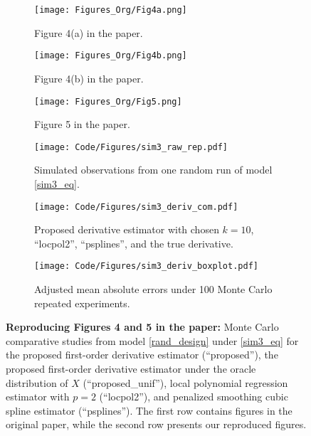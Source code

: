 \documentclass{uwstat572}
\theoremstyle{definition}
\theoremstyle{theorem}
\begin{document}
\begin{figure}[!t]
	\captionsetup[subfigure]{justification=centering}
	\begin{subfigure}[t]{0.32\linewidth}
		\centering
		\texttt{[image: Figures\_Org/Fig4a.png]}
		\caption{Figure 4(a) in the paper.}
	\end{subfigure}
	\hfil
	\begin{subfigure}[t]{0.32\linewidth}
		\centering
		\texttt{[image: Figures\_Org/Fig4b.png]}
		\caption{Figure 4(b) in the paper.}
	\end{subfigure}
	\hfil
	\begin{subfigure}[t]{0.32\linewidth}
		\centering
		\texttt{[image: Figures\_Org/Fig5.png]}
		\caption{Figure 5 in the paper.}
	\end{subfigure}
	\begin{subfigure}[t]{0.32\linewidth}
		\centering
		\texttt{[image: Code/Figures/sim3\_raw\_rep.pdf]}
		\caption{Simulated observations from one random run of model \eqref{sim3_eq}.}
	\end{subfigure}
	\hfil
	\begin{subfigure}[t]{0.32\linewidth}
		\centering
		\texttt{[image: Code/Figures/sim3\_deriv\_com.pdf]}
		\caption{Proposed derivative estimator with chosen $k=10$, ``locpol2'', ``psplines'', and the true derivative.}
	\end{subfigure}
	\hfil
	\begin{subfigure}[t]{0.32\linewidth}
		\centering
		\texttt{[image: Code/Figures/sim3\_deriv\_boxplot.pdf]}
		\caption{Adjusted mean absolute errors under 100 Monte Carlo repeated experiments.}
	\end{subfigure}
	\caption{{\bf Reproducing Figures 4 and 5 in the paper:} Monte Carlo comparative studies from model \eqref{rand_design} under \eqref{sim3_eq} for the proposed first-order derivative estimator (``proposed''), the proposed first-order derivative estimator under the oracle distribution of $X$ (``proposed\_unif''), local polynomial regression estimator with $p=2$ (``locpol2''), and penalized smoothing cubic spline estimator (``psplines''). The first row contains figures in the original paper, while the second row presents our reproduced figures.}
	\label{fig:sim3_rep}
\end{figure}
\end{document}
